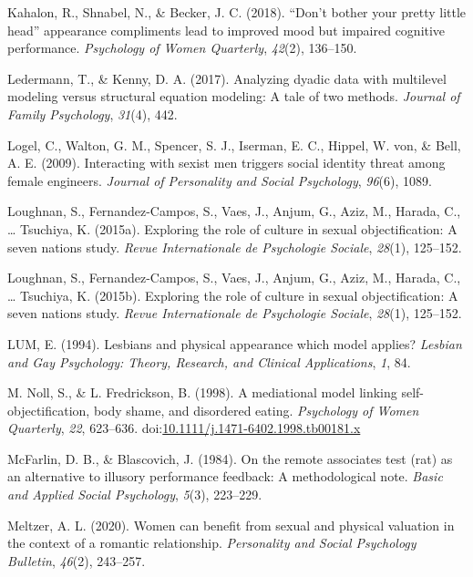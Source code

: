\documentclass[man]{apa6}
\begin{document}
\hypertarget{ref-kahalon2018don}{}
Kahalon, R., Shnabel, N., \& Becker, J. C. (2018). ``Don't bother your
pretty little head'' appearance compliments lead to improved mood but
impaired cognitive performance. \emph{Psychology of Women Quarterly},
\emph{42}(2), 136--150.

\hypertarget{ref-ledermann2017analyzing}{}
Ledermann, T., \& Kenny, D. A. (2017). Analyzing dyadic data with
multilevel modeling versus structural equation modeling: A tale of two
methods. \emph{Journal of Family Psychology}, \emph{31}(4), 442.

\hypertarget{ref-logel2009interacting}{}
Logel, C., Walton, G. M., Spencer, S. J., Iserman, E. C., Hippel, W.
von, \& Bell, A. E. (2009). Interacting with sexist men triggers social
identity threat among female engineers. \emph{Journal of Personality and
Social Psychology}, \emph{96}(6), 1089.

\hypertarget{ref-loughnan2015exploring}{}
Loughnan, S., Fernandez-Campos, S., Vaes, J., Anjum, G., Aziz, M.,
Harada, C., \ldots{} Tsuchiya, K. (2015a). Exploring the role of culture
in sexual objectification: A seven nations study. \emph{Revue
Internationale de Psychologie Sociale}, \emph{28}(1), 125--152.

\hypertarget{ref-loughnan2015}{}
Loughnan, S., Fernandez-Campos, S., Vaes, J., Anjum, G., Aziz, M.,
Harada, C., \ldots{} Tsuchiya, K. (2015b). Exploring the role of culture
in sexual objectification: A seven nations study. \emph{Revue
Internationale de Psychologie Sociale}, \emph{28}(1), 125--152.

\hypertarget{ref-lum1994lesbians}{}
LUM, E. (1994). Lesbians and physical appearance which model applies?
\emph{Lesbian and Gay Psychology: Theory, Research, and Clinical
Applications}, \emph{1}, 84.

\hypertarget{ref-nollfredrickson1998}{}
M. Noll, S., \& L. Fredrickson, B. (1998). A mediational model linking
self-objectification, body shame, and disordered eating.
\emph{Psychology of Women Quarterly}, \emph{22}, 623--636.
doi:\href{https://doi.org/10.1111/j.1471-6402.1998.tb00181.x}{10.1111/j.1471-6402.1998.tb00181.x}

\hypertarget{ref-mcfarlin1984remote}{}
McFarlin, D. B., \& Blascovich, J. (1984). On the remote associates test
(rat) as an alternative to illusory performance feedback: A
methodological note. \emph{Basic and Applied Social Psychology},
\emph{5}(3), 223--229.

\hypertarget{ref-meltzer2020women}{}
Meltzer, A. L. (2020). Women can benefit from sexual and physical
valuation in the context of a romantic relationship. \emph{Personality
and Social Psychology Bulletin}, \emph{46}(2), 243--257.
\end{document}
